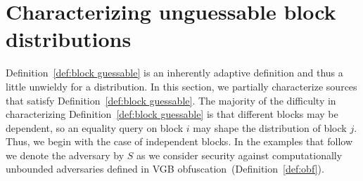\documentclass[11pt]{article}
\newcommand{\defref}[1]{\mbox{Definition~\ref{#1}}}
\begin{document}
\section{Characterizing unguessable block distributions}
\label{sec:characterize}

\defref{def:block guessable} is an inherently adaptive definition and thus a little unwieldy for a distribution.  In this section, we partially characterize sources that satisfy \defref{def:block guessable}.
The majority of the difficulty in characterizing \defref{def:block guessable} is that different blocks may be dependent, so an equality query on block $i$ may shape the distribution of block $j$.  Thus, we begin with the case of independent blocks.  In the examples that follow we denote the adversary by $S$ as we consider security against computationally unbounded adversaries defined in VGB obfuscation~(\defref{def:obf}).
\end{document}
